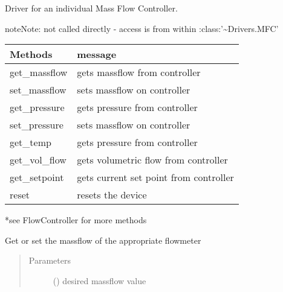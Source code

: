 \documentclass[letterpaper,10pt,english]{sphinxmanual}
\begin{document}
\begin{fulllineitems}
\label{\detokenize{drivers:drivers.AlicatController}}
Driver for an individual Mass Flow Controller.

\begin{sphinxadmonition}{note}{Note:}
not called directly - access is from within :class:’\textasciitilde{}Drivers.MFC’
\end{sphinxadmonition}


\begin{savenotes}\sphinxattablestart
\centering
\begin{tabulary}{\linewidth}[t]{|T|T|}
\hline
\sphinxstyletheadfamily 
Methods
&\sphinxstyletheadfamily 
message
\\
\hline
get\_massflow
&
gets massflow from controller
\\
\hline
set\_massflow
&
sets massflow on controller
\\
\hline
get\_pressure
&
gets pressure from controller
\\
\hline
set\_pressure
&
sets massflow on controller
\\
\hline
get\_temp
&
gets pressure from controller
\\
\hline
get\_vol\_flow
&
gets volumetric flow from controller
\\
\hline
get\_setpoint
&
gets current set point from controller
\\
\hline
reset
&
resets the device
\\
\hline
\end{tabulary}
\par
\sphinxattableend\end{savenotes}

*see FlowController for more methods

\begin{fulllineitems}
\label{\detokenize{drivers:drivers.AlicatController.massflow}}
Get or set the massflow of the appropriate flowmeter
\begin{quote}\begin{description}
\item[{Parameters}] \leavevmode
{} () \textendash{} desired massflow value


\end{description}
\end{quote}
\end{fulllineitems}
\end{fulllineitems}
\end{document}
